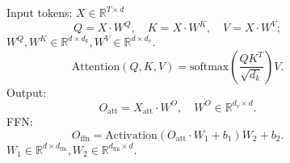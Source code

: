 \begin{frame}
\begin{figure}
\begin{minipage}[t]{0.5\textwidth}
    \end{minipage}\hfill
    \begin{minipage}[t]{0.5\textwidth}
       Input tokens: $X\in\mathbb{R}^{T\times d}$ \\
       \begin{equation}
        Q = X\cdot W^Q, \quad K = X\cdot W^K, \quad V = X\cdot W^V;
       \end{equation}
       $W^Q, W^K \in\mathbb{R}^{d\times d_k}, W^V \in\mathbb{R}^{d\times d_v}$. \\
       \begin{equation}
        \text{Attention}(Q,K,V)=\text{softmax}(\frac{QK^T}{\sqrt{d_k}})V.
       \end{equation}
       Output: $$O_{\text{att}}=X_{\text{att}}\cdot W^O, \quad W^O \in\mathbb{R}^{d_v\times d}.$$
       FFN: $$O_{\text{ffn}} = \text{Activation}(O_{\text{att}}\cdot W_1 + b_1)W_2 + b_2.$$
       $W_1 \in \mathbb{R}^{d\times d_{\text{ffn}}},
       W_2 \in \mathbb{R}^{d_{\text{ffn}}\times d}.$
    \end{minipage}
    
    
    
      \label{fig:multi-head-att}
    \end{figure}
    
\end{frame}
